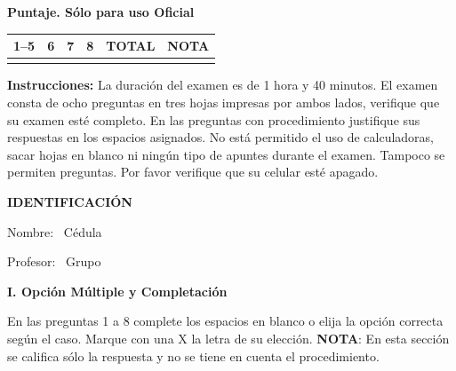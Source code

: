 \documentclass[11pt]{article}
\begin{document}
\examheader

\vspace{4pt}
\noindent
\begin{minipage}[t]{0.62\linewidth}
\textbf{Puntaje. Sólo para uso Oficial}\\[4pt]
\begin{tabular}{|c|c|c|c|c|c|}
\hline
1--5 & 6 & 7 & 8 & \textbf{TOTAL} & \textbf{NOTA} \\ \hline
 & & & & & \\ \hline
\end{tabular}
\end{minipage}

\vspace{6pt}
\noindent\textbf{Instrucciones:} La duración del examen es de 1 hora y 40 minutos. El examen consta de ocho preguntas en tres hojas impresas por ambos lados, verifique que su examen esté completo. En las preguntas con procedimiento justifique sus respuestas en los espacios asignados. No está permitido el uso de calculadoras, sacar hojas en blanco ni ningún tipo de apuntes durante el examen. Tampoco se permiten preguntas. Por favor verifique que su celular esté apagado.

\vspace{6pt}
\noindent\textbf{IDENTIFICACIÓN}

\vspace{8pt}
\noindent Nombre: \dotfill\ Cédula \dotfill

\vspace{4pt}
\noindent Profesor: \dotfill\ Grupo \dotfill

\vspace{10pt}
\begin{center}\textbf{I. Opción Múltiple y Completación}\end{center}
\noindent En las preguntas 1 a 8 complete los espacios en blanco o elija la opción correcta según el caso. Marque con una X la letra de su elección. \textbf{NOTA}: En esta sección se califica sólo la respuesta y no se tiene en cuenta el procedimiento.
\end{document}
